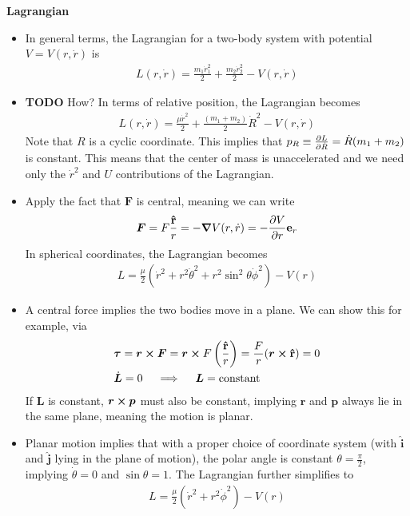\documentclass[11pt, a4paper]{article}
\newcommand{\e}{\mathbf{e}} %
\newcommand{\uvec}[1]{\bm{\hat{\mathbf{#1}}}} %
\begin{document}
\textbf{Lagrangian}
\begin{itemize}
	\item In general terms, the Lagrangian for a two-body system with potential $ V = V(r, \dot{r}) $ is
	\begin{align*}
		L(r, \dot r) = \frac{m_1 \dot{r}_1^2}{2} + \frac{m_2 \dot{r}_2^2}{2} - V(r, \dot{r})
	\end{align*}
	
	\item \textbf{TODO} How? In terms of relative position, the Lagrangian becomes
	\begin{align*}
		L(r, \dot r) = \frac{\mu \dot{r}^2}{2} + \frac{(m_1 + m_2)}{2}\dot{R}^{2}  - V(r, \dot{r})
	\end{align*}
	Note that $ R $ is a cyclic coordinate. This implies that $ p_R \equiv \pdv{L}{\dot R} = \dot{R}(m_1 + m_2)$ is constant.  This means that the center of mass is unaccelerated and we need only the $ \dot{r}^2 $ and $ U $ contributions of the Lagrangian.
	
	\item Apply the fact that $ \bm{F} $ is central, meaning we can write
	\begin{align*}
		\bm{F} = F \frac{\uvec{r}}{r} = - \grad{V(r, \dot{r})} = - \pdv{V}{r} \e_r
	\end{align*}
	In spherical coordinates, the Lagrangian becomes 
	\begin{align*}
		L = \frac{\mu}{2} \left(\dot{r}^2 + r^2 \dot{\theta}^2 + r^2 \sin^2 \theta \dot{\phi}^2 \right) - V(r)
	\end{align*}
	
	\item A central force implies the two bodies move in a plane. We can show this for example, via
	\begin{align*}
		&\bm{\tau} = \bm{r} \cross \bm{F} = \bm{r} \cross F \left(\frac{\uvec{r}}{r}\right) = \frac{F}{r} (\bm{r} \cross \uvec{r}) = 0\\
		&\dot{\bm{L}} = 0 \quad \implies \quad \bm{L} = \text{constant}
	\end{align*}
	If $ \bm{L} $ is constant, $ \bm{r} \cross \bm{p} $ must also be constant, implying $ \bm{r} $ and $ \bm{p} $ always lie in the same plane, meaning the motion is planar.
	
	\item Planar motion implies that with a proper choice of coordinate system (with $ \uvec{i} $ and $ \uvec{j} $ lying in the plane of motion), the polar angle is constant $ \theta = \frac{\pi}{2}$, implying $ \dot \theta = 0 $ and $ \sin \theta = 1 $. The Lagrangian further simplifies to 
	\begin{align*}
		L = \frac{\mu}{2} \left(\dot{r}^2 + r^2 \dot{\phi}^2 \right) - V(r)
	\end{align*}
	

\end{itemize}
\end{document}

